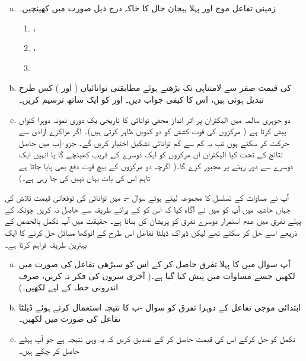 \begin{enumerate}[a.]
\item
زمینی تفاعل موج  اور پہلا ہیجان حال  کا خاکہ درج ذیل صورت میں کھینچیں۔
\begin{multicols}{3}
\begin{enumerate}[1.]
\item
 ،
 \item
 ،
\item 
 \end{enumerate}
 \end{multicols}
\item
  کی قیمت صفر سے لامتناہی تک بڑھتے ہوئے مطابقتی توانائیاں ( اور ) کس طرح تبدیل ہوتی ہیں، اس کا کیفی جواب دیں۔  اور  کو ایک ساتھ ترسیم کریں۔
\item
 دو جوہری سالمہ میں الیکٹران پر اثر انداز مخفی توانائی کا تاریخی یک دوری نمونہ دوہرا کنواں پیش کرتا ہے ( مرکزوں کی قوت کشش کو دو کنویں ظاہر کرتی ہیں)۔ اگر مراکزے آزادی سے حرکت کر سکتے ہوں تب یہ کم سے کم توانائی تشکیل  اختیار کریں گے۔ جزو-(ب میں حاصل نتائج کے تحت کیا الیکٹران ان مرکزوں کو ایک دوسرے کے قریب کھینچے گا یا انہیں ایک دوسرے سے دور رہنے پر مجبور کرے گا۔( اگرچہ دو مرکزوں کے بیچ قوت دفع بھی پایا جاتا ہے تاہم اس کی بات یہاں نہیں کی جا رہی ہے۔)
\end{enumerate}
آپ نے مساوات  کے تسلسل کا مجموعہ لیتے ہوئے سوال -د میں توانائی کی توقعاتی قیمت تلاش کی جہاں حاشیہ میں آپ کو میں نے آگاہ کیا کہ اس کو  کے  پرانے طریقہ سے حاصل نہ کریں چونکہ  کے پہلے تفرق میں عدم استمرار دوسرے تفرق کو پریشان کن بناتا ہے۔ حقیقت میں آپ تکمل بالحصص کے ذریعے اسے حل کر سکتے تھے لیکن ڈیراک ڈیلٹا تفاعل اس طرح کے انوکھا مسائل حل کرنے کا ایک بہترین طریقہ فراہم کرتا ہے۔
\begin{enumerate}[a.]
\item
 آپ سوال  میں  کا پہلا تفرق حاصل کر کے اس کو سیڑھی تفاعل  کی صورت میں لکھیں جسے مساوات  میں پیش کیا گیا ہے۔( آخری سروں کی فکر نہ کریں، صرف اندرونی خطہ  کے لیے لکھیں۔)
\item
 ابتدائی موجی تفاعل  کے دوہرا تفرق کو سوال -ب کا نتیجہ استعمال کرتے ہوئے ڈیلٹا تفاعل کی صورت میں لکھیں۔
\item
 تکمل  کو حل کرکے اس کی قیمت حاصل کر کے تصدیق کریں کہ یہ وہی نتیجہ ہے جو آپ پہلے حاصل کر چکے ہیں۔
\end{enumerate}
